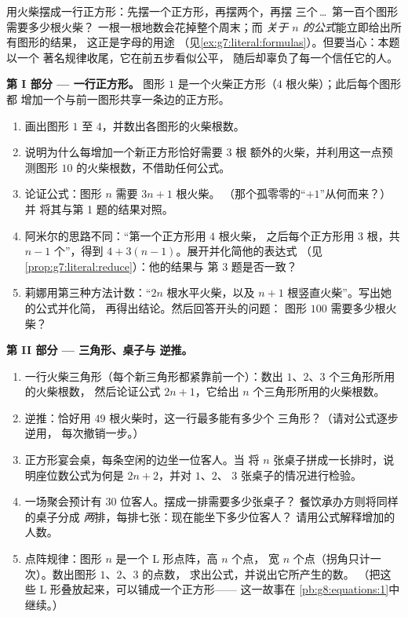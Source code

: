 \begin{problem}
\label{pb:g7:literal:1}
用火柴摆成一行正方形：先摆一个正方形，再摆两个，再摆
三个\,\dots\ 第一百个图形需要多少根火柴？
一根一根地数会花掉整个周末；而\emph{
关于 $n$ 的公式}能立即给出所有图形的结果，
这正是字母的用途
（见\cref{ex:g7:literal:formulas}）。但要当心：本题以一个
著名规律收尾，它在前五步看似公平，
随后却辜负了每一个信任它的人。

\medskip
\noindent\textbf{第 I 部分 --- 一行正方形。}
图形 $1$ 是一个火柴正方形（$4$ 根火柴）；此后每个图形都
增加一个与前一图形共享一条边的正方形。
\begin{enumerate}
  \item 画出图形 $1$ 至 $4$，并数出各图形的火柴根数。
  \item 说明为什么每增加一个新正方形恰好需要 $3$ 根
        额外的火柴，并利用这一点预测图形
        $10$ 的火柴根数，不借助任何公式。
  \item 论证公式：图形 $n$ 需要 $3n + 1$ 根火柴。
        （那个孤零零的“$+1$”从何而来？）并
        将其与第 1 题的结果对照。
  \item 阿米尔的思路不同：“第一个正方形用 $4$ 根火柴，
        之后每个正方形用 $3$ 根，共 $n - 1$ 个”，得到
        $4 + 3(n - 1)$。展开并化简他的表达式
        （见\cref{prop:g7:literal:reduce}）：他的结果与
        第 3 题是否一致？
  \item 莉娜用第三种方法计数：“$2n$ 根水平火柴，以及
        $n + 1$ 根竖直火柴”。写出她的公式并化简，
        再得出结论。然后回答开头的问题：
        图形 $100$ 需要多少根火柴？
\end{enumerate}

\medskip
\noindent\textbf{第 II 部分 --- 三角形、桌子与
逆推。}
\begin{enumerate}[resume]
  \item 一行火柴三角形（每个新三角形都紧靠前一个）：数出
        $1$、$2$、$3$ 个三角形所用的火柴根数，
        然后论证公式 $2n + 1$，它给出
        $n$ 个三角形所用的火柴根数。
  \item 逆推：恰好用 $49$ 根火柴时，这一行最多能有多少个
        三角形？（请对公式逐步逆用，
        每次撤销一步。）
  \item 正方形宴会桌，每条空闲的边坐一位客人。当
        将 $n$ 张桌子拼成一长排时，说明座位数公式为何是
        $2n + 2$，并对 $1$、$2$、
        $3$ 张桌子的情况进行检验。
  \item 一场聚会预计有 $30$ 位客人。摆成一排需要多少张桌子？
        餐饮承办方则将同样的桌子分成
        \emph{两}排，每排七张：现在能坐下多少位客人？
        请用公式解释增加的人数。
  \item 点阵规律：图形 $n$ 是一个 L 形点阵，高 $n$ 个点，
        宽 $n$ 个点（拐角只计一次）。数出图形 $1$、$2$、$3$ 的点数，
        求出公式，并说出它所产生的数。
        （把这些 L 形叠放起来，可以铺成一个正方形——
        这一故事在
        \cref{pb:g8:equations:1}中继续。）
\end{enumerate}


\end{problem}
